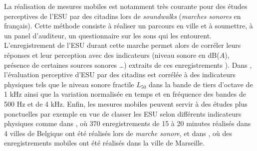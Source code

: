 La réalisation de mesures mobiles est notamment très courante pour des études perceptives de l'ESU par des citadins lors de \textit{soundwalks} (\textit{marches sonores} en français). Cette méthode consiste à réaliser un parcours en ville et à soumettre, à un panel d'auditeur, un questionnaire sur les sons qui les entourent. L'enregistrement de l'ESU durant cette marche permet alors de corréler leurs réponses et leur perception avec des indicateurs (niveau sonore en dB($A$), présence de certaines sources sonores \dots{}) extraits de ces enregistrements \cite{brocolini_measurements_2013, hong2013designing}). Dans \cite{aumond2017modeling}, l'évaluation perceptive d'ESU par des citadins est corrélée à des indicateurs physiques tels que le niveau sonore fractile $L_{50}$ dans la bande de tiers d'octave de 1 kHz ainsi que la variation normalisée en temps et en fréquence des bandes de 500 Hz et de 4 kHz.
Enfin, les mesures mobiles peuvent servir à des études plus ponctuelles par exemple en vue de classer les ESU selon différents indicateurs physiques comme dans \cite{rychtarikova2013soundscape}, où 370 enregistrements de 15 à 20 minutes réalisés dans 4 villes de Belgique ont été réalisés lors de \textit{marche sonore}, et dans \cite{can_describing_2015}, où des enregistrements mobiles ont été réalisés dans la ville de Marseille.


